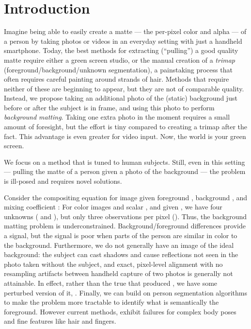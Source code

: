 \documentclass[10pt,twocolumn,letterpaper]{article}
\begin{document}
 \vspace{-1em}
\section{Introduction}
\label{sec:intro}



Imagine being able to easily create a matte — the per-pixel color and alpha — of a person by taking photos or videos in an everyday setting with just a handheld smartphone.  Today, the best methods for extracting (“pulling”) a good quality matte require either a green screen studio, or the manual creation of a {\em trimap} (foreground/background/unknown segmentation), a painstaking process that often requires careful painting around strands of hair.  Methods that require neither of these are beginning to appear, but they are not of comparable quality.  Instead, we propose taking an additional photo of the (static) background just before or after the subject is in frame, and using this photo to perform {\em background matting}.  Taking one extra photo in the moment requires a small amount of foresight, but the effort is tiny compared to creating a trimap after the fact. This advantage is even greater for video input.  Now, the world is your green screen.   

We focus on a method that is tuned to human subjects.
Still, even in this setting — pulling the matte of a person given a photo of the background — the problem is ill-posed and requires novel solutions. 

Consider the compositing equation for image  given foreground , background , and mixing coefficient : 
For color images and scalar , and given , we have four unknowns ( and ), but only three observations per pixel ().  Thus, the background matting problem is underconstrained.  Background/foreground differences 
provide a signal, but the signal is poor when parts of the person are similar in color to the background.  Furthermore, we do not generally have an image of the ideal background: the subject can cast shadows and cause reflections not seen in the photo taken without the subject, and exact, pixel-level alignment with no resampling artifacts between handheld capture of two photos is generally not attainable.  In effect, rather than the true  that produced , we have some perturbed version of it, . Finally, we can build on person segmentation algorithms to make the problem more tractable to identify what is semantically the foreground. However current methods, exhibit failures for complex body poses and fine features like hair and fingers. 
\end{document}

